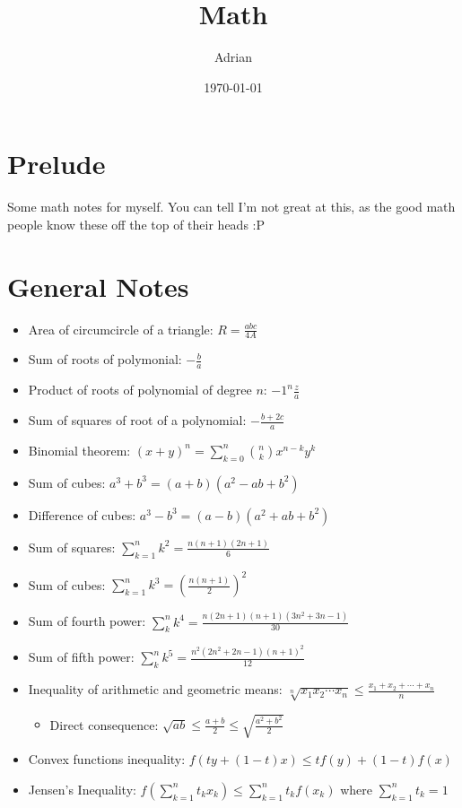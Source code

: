 \documentclass{article}
\begin{document}
\title{Math}
\date{\today}
\author{Adrian}
\maketitle

\section{Prelude}
Some math notes for myself. You can tell I'm not great at this, as the good math people know these off the top of their heads :P

\section{General Notes}
\begin{itemize}
	\item Area of circumcircle of a triangle: $R = \frac{abc}{4A}$
	\item Sum of roots of polymonial: $-\frac{b}{a}$
	\item Product of roots of polynomial of degree $n$: ${-1}^{n}\frac{z}{a}$
	\item Sum of squares of root of a polynomial: $-\frac{b + 2c}{a}$
	\item Binomial theorem: $(x + y)^n = \sum_{k=0}^{n} {n \choose k}x^{n - k}y^k$
	\item Sum of cubes: $a^3 + b^3 = (a + b)(a^2 - ab + b^2)$
	\item Difference of cubes: $a^3 - b^3 = (a - b)(a^2 + ab + b^2)$
	\item Sum of squares: $\sum_{k=1}^{n} k^2 = \frac{n(n + 1)(2n + 1)}{6}$
	\item Sum of cubes: $\sum_{k=1}^{n} k^3 = (\frac{n(n + 1)}{2})^2$
	\item Sum of fourth power: $\sum_{k}^{n} k^4 = \frac{n(2n + 1)(n + 1)(3n^2 + 3n - 1)}{30}$
	\item Sum of fifth power: $\sum_{k}^{n} k^5 = \frac{n^{2}(2n^2 + 2n - 1)(n + 1)^2}{12}$
	\item Inequality of arithmetic and geometric means: $\sqrt[n]{x_{1}x_{2}\cdots{}x_{n}} \leq \frac{x_1 + x_2 + \cdots + x_n}{n}$
	\begin{itemize}
		\item Direct consequence: $\sqrt{ab} \leq \frac{a + b}{2} \leq \sqrt{\frac{a^2 + b^2}{2}}$
	\end{itemize}
	\item Convex functions inequality: $f(ty + (1 - t)x) \leq tf(y) + (1 - t)f(x)$
	\item Jensen's Inequality: $f(\sum_{k=1}^{n} t_{k}x_{k}) \leq \sum_{k=1}^{n} t_{k}f(x_{k})$ where $\sum_{k=1}^{n} t_k = 1$

\end{itemize}
\end{document}
